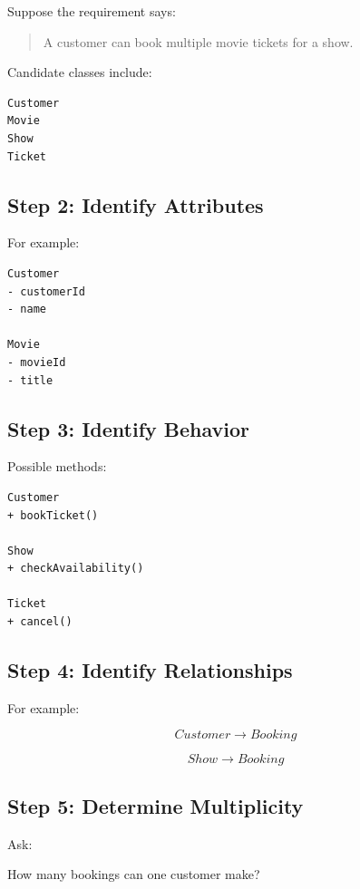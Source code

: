 \documentclass[11pt,a4paper]{article}
\begin{document}
Suppose the requirement says:

\begin{quote}
A customer can book multiple movie tickets for a show.
\end{quote}

Candidate classes include:

\begin{verbatim}
Customer
Movie
Show
Ticket
\end{verbatim}

\subsection{Step 2: Identify Attributes}

For example:

\begin{verbatim}
Customer
- customerId
- name

Movie
- movieId
- title
\end{verbatim}

\subsection{Step 3: Identify Behavior}

Possible methods:

\begin{verbatim}
Customer
+ bookTicket()

Show
+ checkAvailability()

Ticket
+ cancel()
\end{verbatim}

\subsection{Step 4: Identify Relationships}

For example:

\[
Customer \longrightarrow Booking
\]

\[
Show \longrightarrow Booking
\]

\subsection{Step 5: Determine Multiplicity}

Ask:

\begin{center}
How many bookings can one customer make?
\end{center}
\end{document}
